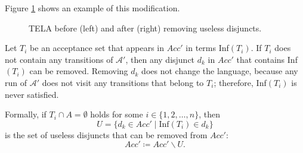 \documentclass[
  digital, %
  twoside, %
  table,   %
  lof,     %
  lot,     %
]{fithesis3}
\begin{document}
Figure \ref{fig:rem_dis_fin} shows an example of this modification.

\begin{figure}[h]
  \centering
  \caption{TELA before (left) and after (right) removing useless disjuncts.}
  \label{fig:rem_dis_fin}
\end{figure}

Let $T_i$ be an acceptance set that appears in $Acc'$ in terms Inf$(T_i)$. If $T_i$ does not contain any transitions of $\mathcal{A'}$, then any disjunct $d_k$ in $Acc'$ that contains Inf$(T_i)$ can be removed. Removing $d_k$ does not change the language, because any run of $\mathcal{A'}$ does not visit any transitions that belong to $T_i$; therefore, Inf$(T_i)$ is never satisfied.

Formally, if $T_i \cap A = \emptyset$ holds for some $i \in \{1,2, \dots, n\}$, then 
\begin{equation*}
  U = \{d_k \in Acc' \mid \text{Inf}(T_i) \in d_k \}
\end{equation*}
is the set of useless disjuncts that can be removed from $Acc'$:
\begin{equation*}
  Acc' \coloneqq Acc' \smallsetminus U.
\end{equation*}
\end{document}
